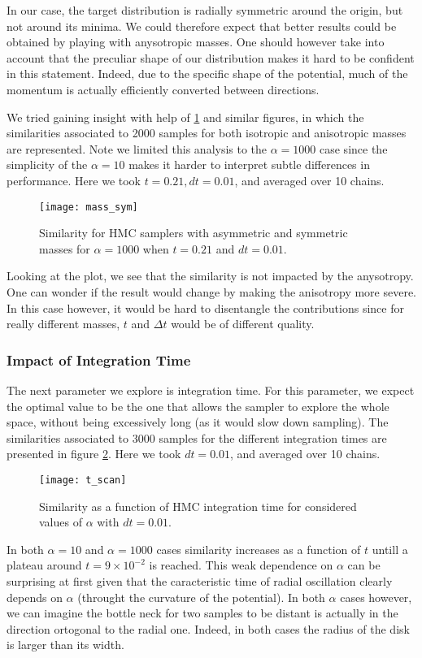 \documentclass[a4paper, 12pt,oneside]{article}
\begin{document}
			In our case, the target distribution is radially symmetric around the origin, but not around its minima. We could therefore expect that better results could be obtained by playing with anysotropic masses. One should however take into account that the preculiar shape of our distribution makes it hard to be confident in this statement.
			Indeed, due to the specific shape of the potential, much of the momentum is actually efficiently converted between directions. 

			We tried gaining insight with help of \ref{fig:mass-sym} and similar figures, in which the similarities associated to 2000 samples for both isotropic and anisotropic masses are represented. Note we limited this analysis to the $\alpha=1000$ case since the simplicity of the $\alpha=10$ makes it harder to interpret subtle differences in performance. Here we took $t=0.21,dt=0.01$, and averaged over 10 chains.  
			\begin{figure}[htb]
				\centering
					\vspace{0em}
					\texttt{[image: mass\_sym]}
					\caption{Similarity for HMC samplers with asymmetric and symmetric masses for $\alpha=1000$ when $t=0.21$ and $dt=0.01$.}
					\label{fig:mass-sym}
			\end{figure}
			Looking at the plot, we see that the similarity is not impacted by the anysotropy. One can wonder if the result would change by making the anisotropy more severe. In this case however, it would be hard to disentangle the contributions since for really different masses, $t$ and $\Delta t$ would be of different quality.  
			\subsubsection{Impact of Integration Time}
			The next parameter we explore is integration time. For this parameter, we expect the optimal value to be the one that allows the sampler to explore the whole space, without being excessively long (as it would slow down sampling).
			The similarities associated to 3000 samples for the different integration times are presented in figure \ref{fig:t-scan}. Here we took $dt=0.01$, and averaged over 10 chains.  
			\begin{figure}[htb]
				\centering
					\vspace{0em}
					\texttt{[image: t\_scan]}
					\caption{Similarity as a function of HMC integration time for considered values of $\alpha$ with $dt=0.01$.}
					\label{fig:t-scan}
			\end{figure}
			In both $\alpha=10$ and $\alpha=1000$ cases similarity increases as a function of $t$ untill a plateau around $t=9\times 10^{-2}$ is reached. This weak dependence on $\alpha$ can be surprising at first given that the caracteristic time of radial oscillation clearly depends on $\alpha$ (throught the curvature of the potential). In both $\alpha$ cases however, we can imagine the bottle neck for two samples to be distant is actually in the direction ortogonal to the radial one. Indeed, in both cases the radius of the disk is larger than its width.   
\end{document}
